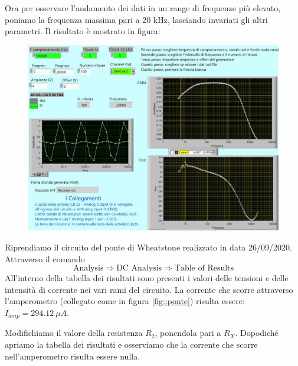 Ora per osservare l'andamento dei dati in un range di frequenze più elevato, poniamo la frequenza massima pari a 20 kHz, lasciando invariati gli altri parametri. Il risultato è mostrato in figura:
\begin{figure}[H]
\caption{}
    \includegraphics[width=12cm]{settimana_2/immagini/CRRC_3_nuovo.jpg}
    \centering
\end{figure}



Riprendiamo il circuito del ponte di Wheatstone realizzato in data 26/09/2020. Attraverso il comando
\begin{equation}
    \text{Analysis} \Rightarrow \text{DC Analysis} \Rightarrow \text{Table of Results}
\end{equation}
All'interno della tabella dei risultati sono presenti i valori delle tensioni e delle intensità di corrente nei vari rami del circuito. La corrente che scorre attraverso l'amperometro (collegato come in figura \ref{fig::ponte}) risulta essere: $I_{amp} = 294.12 \: \mu A$.


Modifichiamo il valore della resistenza $R_2$, ponendola pari a $R_X$. Dopodiché apriamo la tabella dei risultati e osserviamo che la corrente che scorre nell'amperometro risulta essere nulla.



